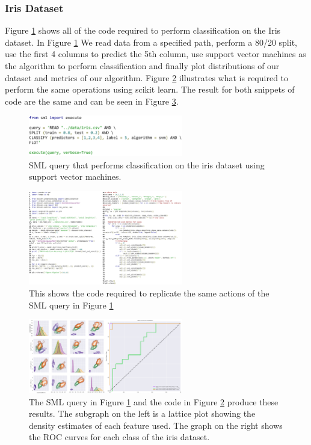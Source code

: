\documentclass[jair,twoside,11pt,theapa]{article}
\begin{document}
\subsubsection{Iris Dataset}
Figure \ref{fig:SML:IrisQuery} shows all of the code required to perform classification on the Iris dataset. In Figure \ref{fig:SML:IrisQuery} We read data from a specified path, perform a 80/20 split, use the first 4 columns to predict the 5th column, use support vector machines as the algorithm to perform classification and finally plot distributions of our dataset  and metrics of our algorithm. Figure \ref{fig:Manual:IrisCode} illustrates what is required to perform the same operations using scikit learn. The  result for both  snippets of code are the same and can be seen in Figure \ref{fig:IrisResults}.

\begin{figure}
\includegraphics[width=0.6\textwidth]{figs/iris_sml.png}
\centering
\caption{SML query that performs classification on the iris dataset using support vector machines.}
\label{fig:SML:IrisQuery}
\end{figure}

\begin{figure}
\includegraphics[width=0.6\textwidth]{figs/iris_manual.png}
\centering
\caption{This shows the code required to replicate the same actions of the SML query in Figure \ref{fig:SML:IrisQuery}}
\label{fig:Manual:IrisCode}
\end{figure}

\begin{figure}
\includegraphics[width=0.6\textwidth]{figs/iris_results.png}
\centering
\caption{The SML query in Figure \ref{fig:SML:IrisQuery} and the code in Figure \ref{fig:Manual:IrisCode} produce these results. The subgraph on the left is a lattice plot showing the density estimates of each feature used. The graph on the right shows the ROC curves for each class of the iris dataset.}
\label{fig:IrisResults}
\end{figure}
\end{document}
